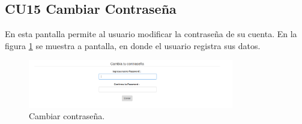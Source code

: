 \subsection{CU15 Cambiar Contraseña}
{
\justify
{}
}

\justify
En esta pantalla permite al usuario modificar la contraseña de su cuenta.
{
\justify
{}
}
\justify
En la figura \ref{fig:IU15} se muestra a pantalla, en donde el usuario registra sus datos.

\begin{figure}[htb]
\centering
\includegraphics[width=0.8\textwidth]{./images/cu15-cambiar-contrasena.png}
\caption{Cambiar contraseña.} \label{fig:IU15}
\end{figure}